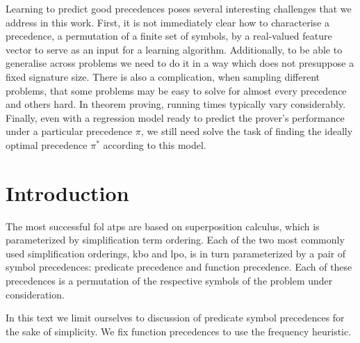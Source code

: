 Learning to predict good precedences poses several interesting challenges that we address in this work.
First, it is not immediately clear how to characterise a precedence, a permutation of a finite set of symbols,
by a real-valued feature vector to serve as an input for a learning algorithm. 
Additionally, to be able to generalise across problems
we need to do it in a way which does not presuppose a fixed signature size. 
There is also a complication, when sampling different problems,
that some problems may be easy to solve for almost every precedence and others hard.
In theorem proving, running times typically vary considerably.
Finally, even with a regression model ready to predict the prover's performance 
under a particular precedence $\pi$, we still need solve the task of finding 
the ideally optimal precedence $\pi^*$ according to this model.







\newpage

\section{Introduction}

The most successful \gls{fol} \glspl{atp} are based on superposition calculus,
which is parameterized by simplification term ordering.
Each of the two most commonly used simplification orderings, \gls{kbo} and \gls{lpo},
is in turn parameterized by a pair of symbol precedences:
predicate precedence and function precedence.
Each of these precedences is a permutation of the respective symbols of the problem under consideration.

In this text we limit ourselves to discussion of predicate symbol precedences for the sake of simplicity.
We fix function precedences to use the frequency heuristic.

